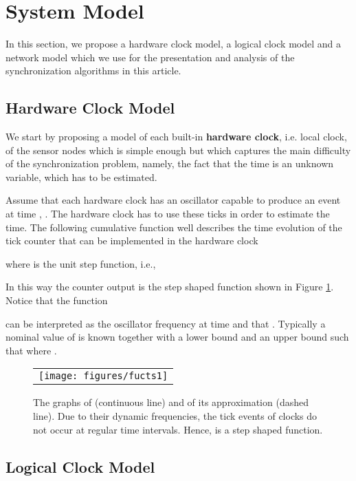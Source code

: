 \documentclass[english,a4paper,10pt,final]{article}
\numberwithin{equation}{section}
\numberwithin{figure}{section}
\begin{document}
\section{System Model}

\label{sec:System-Model}

In this section, we propose a hardware clock model, a logical clock model and a network model which we use for the presentation and analysis of the synchronization algorithms in this article.

\subsection{Hardware Clock Model}

We start by proposing a model of each built-in \textbf{hardware clock}, i.e. local clock, of the sensor nodes which is simple enough but which captures the main difficulty of the synchronization problem, namely, the fact that the time is an unknown variable, which has to be estimated. 

Assume that each hardware clock has an oscillator capable to produce an event at time , . The hardware clock has to use these ticks in order to estimate the time. The following cumulative function well describes the time evolution of the tick counter that can be implemented in the hardware clock
  
where  is the unit step function, i.e.,

In this way the counter output is the step shaped function shown in Figure \ref{fig:sdit}.
Notice that the function

can be interpreted as the oscillator frequency at time  and that . Typically a nominal value  of  is known together with a lower bound  
 and an upper bound  such that  where .

\begin{figure}
\begin{center}
\begin{tabular}{c}
\texttt{[image: figures/fucts1]}
\end{tabular}
\caption{\label{fig:sdit} The graphs of  (continuous line) and of its approximation  (dashed line).  Due to their dynamic frequencies, the tick events of clocks do not occur at regular time intervals. Hence,  is a step shaped function.}
\end{center}
\end{figure}

\subsection{Logical Clock Model}
\end{document}
